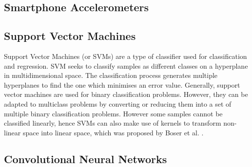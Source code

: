 \subsection{Smartphone Accelerometers}

\subsection{Support Vector Machines}
    Support Vector Machines (or SVMs) are a type of classifier used for classification and regression. SVM seeks to classify samples as different classes
    on a hyperplane in multidimensional space. The classification process generates multiple hyperplanes to find the one which minimises an error value.
    Generally, support vector machines are used for binary classification problems. However, they can be adapted to multiclass problems by converting
    or reducing them into a set of multiple binary classification problems. However some samples cannot be classified linearly, hence SVMs can also make
    use of kernels to transform non-linear space into linear space, which was proposed by Boser et al. \cite{Boser1992}.


\subsection{Convolutional Neural Networks}